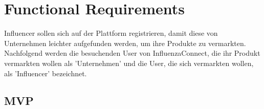 \documentclass[conference,a4paper,flushend]{cs-techrep}
\begin{document}



\newpage
\section{Functional Requirements}
Influencer sollen sich auf der Plattform registrieren, damit diese von Unternehmen leichter aufgefunden werden, um ihre Produkte zu vermarkten. Nachfolgend werden die besuchenden User von InfluenzaConnect, die ihr Produkt vermarkten wollen als 'Unternehmen' und die User, die sich vermarkten wollen, als 'Influencer' bezeichnet.



\subsection{MVP}
\end{document}
